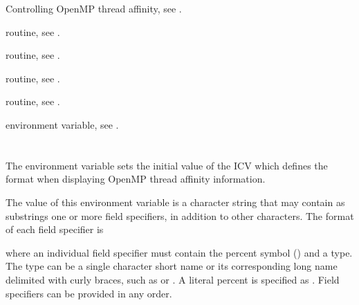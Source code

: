 \begin{crossrefs}
\item Controlling OpenMP thread affinity, 
see .

\item {} routine, 
see .

\item {} routine, 
see .

\item {} routine, 
see .

\item {} routine, 
see .

\item {} environment variable, 
see .
\end{crossrefs}



\section{}
\label{sec:OMP_AFFINITY_FORMAT}

The  environment variable sets the initial value of the
 ICV which defines the format when displaying OpenMP
thread affinity information.

The value of this environment variable is a character string that may contain as
substrings one or more field specifiers, in addition to other characters.
The format of each field specifier is

\begin{ompSyntax}
\end{ompSyntax}

where an individual field specifier must contain the percent symbol 
({\pcode{\%}}) and a type. The type can be a single character short 
name or its corresponding long name delimited with curly braces,
 such as {} or {}. A literal percent 
is specified as {\pcode{\%\%}}.  Field specifiers can be provided in any order.

